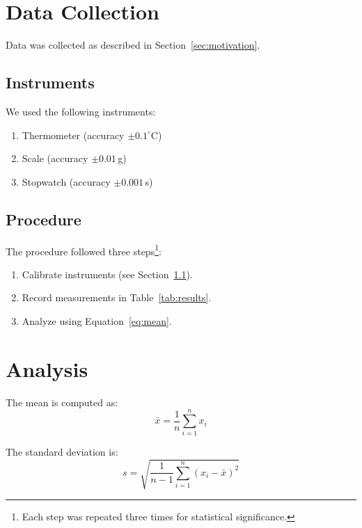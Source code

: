 \documentclass[12pt, a4paper]{report}
\begin{document}
\section{Data Collection}
\label{sec:data}

Data was collected as described in Section~\ref{sec:motivation}.

\subsection{Instruments}
\label{sec:instruments}

We used the following instruments:
\begin{enumerate}
    \item Thermometer (accuracy $\pm 0.1^\circ$C)
    \item Scale (accuracy $\pm 0.01$\,g)
    \item Stopwatch (accuracy $\pm 0.001$\,s)
\end{enumerate}

\subsection{Procedure}
\label{sec:procedure}

The procedure followed three steps\footnote{Each step was repeated three times
for statistical significance.}:

\begin{enumerate}
    \item Calibrate instruments (see Section~\ref{sec:instruments}).
    \item Record measurements in Table~\ref{tab:results}.
    \item Analyze using Equation~\eqref{eq:mean}.
\end{enumerate}

\section{Analysis}
\label{sec:analysis}

The mean is computed as:
\begin{equation}
    \bar{x} = \frac{1}{n}\sum_{i=1}^{n} x_i
    \label{eq:mean}
\end{equation}

The standard deviation is:
\begin{equation}
    s = \sqrt{\frac{1}{n-1}\sum_{i=1}^{n}(x_i - \bar{x})^2}
    \label{eq:stddev}
\end{equation}
\end{document}

